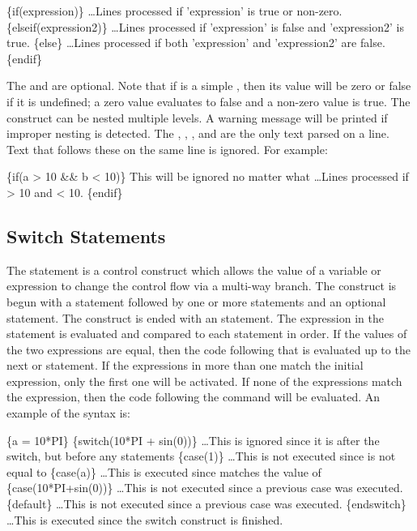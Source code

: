 \begin{apinp}
\{if(expression)\}
\ldots Lines processed if 'expression' is true or non-zero.
\{elseif(expression2)\}
\ldots Lines processed if 'expression' is false and 'expression2' is true.
\{else\}
\ldots Lines processed if both 'expression' and 'expression2' are false.
\{endif\}
\end{apinp}

The  and  are optional.  Note that if  is a simple , then its value will be zero or false if it is undefined; a zero value evaluates to false and a non-zero value is true. The  construct can be nested multiple levels.
A warning message will be printed if improper nesting is detected. The , 
, , and  are the 
only text parsed on a line. Text that follows these on the same line is
ignored.  For example:

\begin{apinp}
\{if(a > 10 && b < 10)\} This will be ignored no matter what
\ldots Lines processed if  > 10 and  < 10.
\{endif\}
\end{apinp}

\subsection{Switch Statements}
The  statement is a control construct which allows the value of a variable or expression to change the control flow via a multi-way branch.
The construct is begun with a  statement followed by one or more  statements and an optional  statement. The construct is ended with an  statement.  The expression in the  statement is evaluated and compared to each  statement in order.  If the values of the two expressions are equal, then the code following that  is evaluated up to the next  or  statement. If the expressions in more than one  match the initial  expression, only the first one will be activated.  If none of the  expressions match the  expression, then the code following the  command will be evaluated. An example of the syntax is:

\begin{apinp}
\{a = 10*PI\}
\{switch(10*PI + sin(0))\}
\ldots This is ignored since it is after the switch, but before any  statements
\{case(1)\}
\ldots This is not executed since  is not equal to 
\{case(a)\}
\ldots This is executed since  matches the value of 
\{case(10*PI+sin(0))\}
\ldots This is not executed since a previous case was executed.
\{default\}
\ldots This is not executed since a previous case was executed.
\{endswitch\}
\ldots This is executed since the switch construct
 is finished.
\end{apinp}

